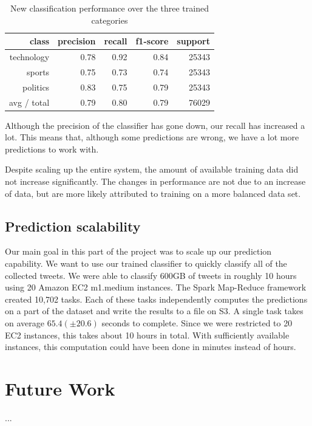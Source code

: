 \documentclass{llncs}
\begin{document}
\begin{table}
	\begin{center}
		\begin{tabular}{|r|r|r|r|r|} \hline
			class  & precision   & recall & f1-score  & support \\ \hline
			technology    &   0.78 &     0.92  &    0.84   &  25343 \\
			sports   &    0.75   &   0.73   &   0.74   &   25343 \\
			politics   &    0.83  &    0.75   &   0.79   &   25343 \\
			avg / total  &     0.79   &   0.80  &    0.79   &  76029 \\ \hline
		\end{tabular}
	\end{center}
	\caption{New classification performance over the three trained categories}
	\label{tbl:newclassifier}
\end{table}

Although the precision of the classifier has gone down, our recall has increased a lot. This means that, although some predictions are wrong, we have a lot more predictions to work with.

Despite scaling up the entire system, the amount of available training data did not increase significantly. The changes in performance are not due to an increase of data, but are more likely attributed to training on a more balanced data set.

\subsection{Prediction scalability}

Our main goal in this part of the project was to scale up our prediction capability. We want to use our trained classifier to quickly classify all of the collected tweets. We were able to classify 600GB of tweets in roughly 10 hours using 20 Amazon EC2 m1.medium instances. The Spark Map-Reduce framework created 10,702 tasks. Each of these tasks independently computes the predictions on a part of the dataset and write the results to a file on S3. A single task takes on average $65.4 (\pm 20.6)$ seconds to complete. Since we were restricted to 20 EC2 instances, this takes about 10 hours in total. With sufficiently available instances, this computation could have been done in minutes instead of hours.

\section{Future Work}
...






\end{document}
